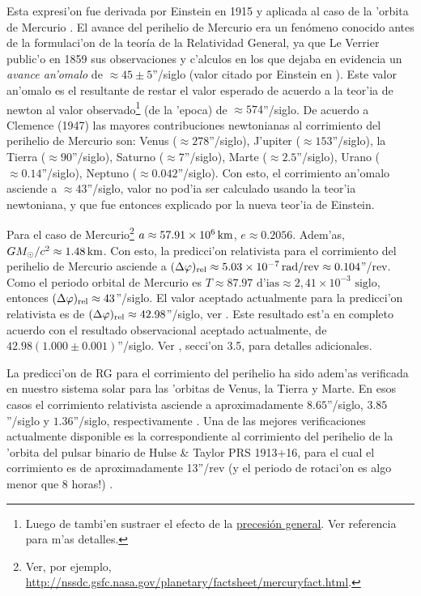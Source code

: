 Esta expresi'on fue derivada por Einstein en 1915 y aplicada al caso de la 'orbita de Mercurio \cite{Einstein15}. El avance del perihelio de Mercurio era un fen\'omeno conocido antes de la formulaci'on de la teor\'ia de la Relatividad General, ya que Le Verrier \cite{LeVerrier} public'o en 1859 sus observaciones y c'alculos en los que dejaba en evidencia un \textit{avance an'omalo} de $\approx 45\pm 5$''/siglo  (valor citado por Einstein en \cite{Einstein15}). Este valor an'omalo es el resultante de restar el valor esperado de acuerdo a la teor'ia de newton al valor observado\footnote{Luego de tambi'en sustraer el efecto de la \href{http://en.wikipedia.org/wiki/Axial_precession}{precesi\'on general}. Ver referencia \cite{Clemence47} para m'as detalles.} (de la 'epoca) de $\approx 574$''/siglo.  De acuerdo a Clemence (1947) \cite{Clemence47} las mayores contribuciones newtonianas al corrimiento del perihelio de Mercurio son: Venus ($\approx 278$''/siglo), J'upiter ($\approx 153$''/siglo), la Tierra ($\approx 90$''/siglo), Saturno ($\approx 7$''/siglo), Marte ($\approx 2.5$''/siglo), Urano ($\approx 0.14$''/siglo), Neptuno ($\approx 0.042$''/siglo). Con esto, el corrimiento an'omalo asciende a $\approx 43$''/siglo, valor no pod'ia ser calculado usando la teor'ia newtoniana, y que fue entonces explicado por la nueva teor'ia de Einstein.

Para el caso de Mercurio\footnote{Ver, por ejemplo, \url{http://nssdc.gsfc.nasa.gov/planetary/factsheet/mercuryfact.html}.}  $a\approx 57.91\times 10^6\text{\,km}$, $e\approx 0.2056$. Adem'as, $GM_\odot/c^2\approx 1.48\text{\,km}$. Con esto, la predicci'on relativista para el corrimiento del perihelio de Mercurio asciende a $(\Delta\varphi)_{\rm rel}\approx 5.03\times 10^{-7}{\,\rm rad/rev}\approx 0.104$''/rev. Como el periodo orbital de Mercurio es $T\approx 87.97\text{ d'ias}\approx 2,41\times 10^{-3}\text{ siglo}$, entonces  $(\Delta\varphi)_{\rm rel}\approx 43$''/siglo. El valor aceptado actualmente para la predicci'on relativista es de $(\Delta\varphi)_{\rm rel}\approx 42.98$''/siglo, ver \cite{NW86}. Este resultado est'a en completo acuerdo con el resultado observacional aceptado actualmente, de $42.98(1.000\pm 0.001)$''/siglo. Ver \cite{Will06}, secci'on 3.5, para detalles adicionales.

La predicci'on de RG para el corrimiento del perihelio ha sido adem'as verificada en nuestro sistema solar para las 'orbitas de Venus, la Tierra y Marte. En esos casos el corrimiento relativista asciende a aproximadamente $8.65$''/siglo, $3.85$''/siglo y $1.36$''/siglo, respectivamente \cite{OR94}. Una de las mejores verificaciones actualmente disponible es la correspondiente al corrimiento del perihelio de la 'orbita del pulsar binario de Hulse \& Taylor PRS 1913+16, para el cual el corrimiento es de aproximadamente 13''/rev (y el periodo de rotaci'on es algo menor que 8 horas!) \cite{Taylor93}.

